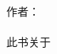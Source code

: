 \begin{titlepage}
  \raggedleft
  {\Large 作者：\\\pdfauthor\\[1in]}    
  {\large 此书关于\\}
  {\Huge\scshape \bookname\\[.2in]}      
  {\large \bookoneword\\}    
  \vfill
  {\itshape \timeandcompany} 
\end{titlepage}